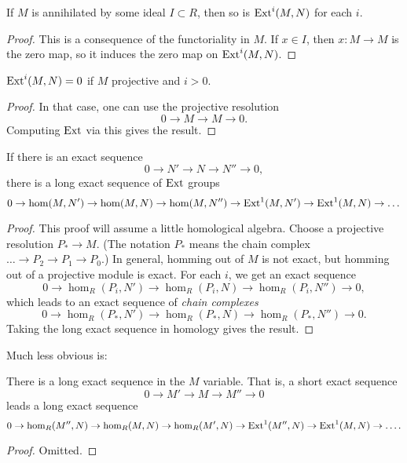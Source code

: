 \begin{proposition} 
If $M$ is annihilated by some ideal $I \subset R$, then so is $\mathrm{Ext}^i(M,N)$ for
each $i$.
\end{proposition} 
\begin{proof} 
This is a consequence of the functoriality in $M$. If $x \in I$, then $x: M \to
M$ is the zero map, so it induces the zero map on $\mathrm{Ext}^i(M,N)$.
\end{proof} 

\begin{proposition} 
$\mathrm{Ext}^i(M,N) = 0$ if $M$ projective and $i>0$.
\end{proposition} 
\begin{proof} 
In that case, one can use the projective resolution
\[ 0 \to M \to M \to 0.  \]
Computing $\mathrm{Ext}$ via this gives the result.
\end{proof} 




\begin{proposition} 
If there is an exact sequence
\[ 0 \to N' \to N \to N'' \to 0,  \]
there is a long exact sequence of $\mathrm{Ext}$ groups
\[ 0 \to \hom(M,N') \to \hom(M,N) \to \hom(M,N'') \to \mathrm{Ext}^1(M,N') \to
\mathrm{Ext}^1(M,N) \to \dots  \]
\end{proposition} 
\begin{proof} 
This proof will assume a little homological algebra. Choose a projective
resolution $P_* \to M$. (The notation $P_*$ means the chain complex $\dots \to
P_2 \to P_1 \to P_0$.) In general, homming out of $M$ is not exact, but homming
out of a projective module is exact. For each $i$, we get an exact sequence
\[ 0 \to \hom_R(P_i, N') \to \hom_R(P_i, N) \to \hom_R(P_i, N'') \to 0,  \]
which leads to an exact sequence of \emph{chain complexes}
\[ 0 \to \hom_R(P_*,N') \to   \hom_R(P_*,N) \to \hom_R(P_*,N'') \to 0 . \]
Taking the long exact sequence in homology gives the result.
\end{proof} 


Much less obvious is:

\begin{proposition} 
There is a long exact sequence in the $M$ variable. That is, a short exact
sequence
\[ 0 \to M' \to M \to M'' \to 0  \]
leads a long exact sequence
\[ 0 \to \hom_R(M'', N) \to \hom_R(M,N) \to \hom_R(M', N) \to \mathrm{Ext}^1(M'', N)
\to \mathrm{Ext}^1(M, N) \to \dots.  \]
\end{proposition} 
\begin{proof} 
Omitted.
\end{proof} 

